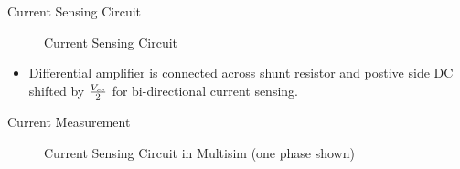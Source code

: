\begin{frame}{Current Sensing Circuit}
	\begin{figure}
		\centering


		\caption{Current Sensing Circuit}
	\end{figure}


	\begin{itemize}
		\item Differential amplifier is connected across shunt resistor and postive side DC shifted by $V_{cc}\over 2$ for bi-directional current sensing.
	\end{itemize}
\end{frame}

\begin{frame}{Current Measurement}
	\begin{figure}
		\centering


		\caption{Current Sensing Circuit in Multisim (one phase shown)}
	\end{figure}
\end{frame}


